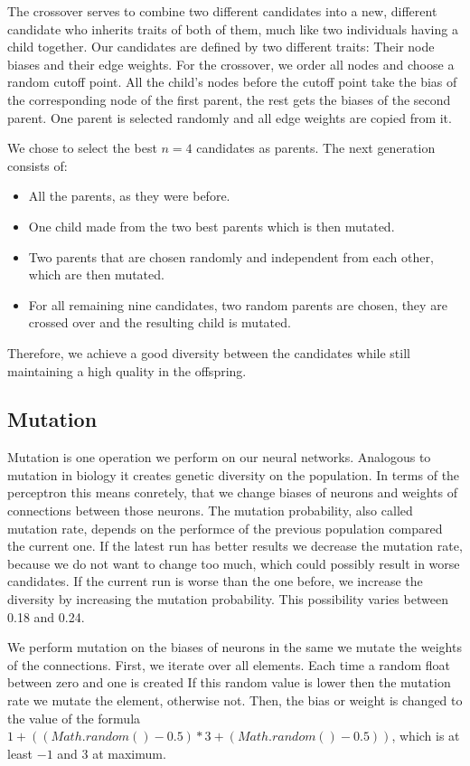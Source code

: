 \documentclass[a4paper,12pt,pagesize,headsepline,bibtotoc,titlepage,abstracton]{scrartcl}
\begin{document}
The crossover serves to combine two different candidates into a new, different candidate who inherits traits of both of them, much like two individuals having a child together. Our candidates are defined by two different traits: Their node biases and their edge weights. For the crossover, we order all nodes and choose a random cutoff point. All the child's nodes before the cutoff point take the bias of the corresponding node of the first parent, the rest gets the biases of the second parent. One parent is selected randomly and all edge weights are copied from it.

We chose to select the best $n=4$ candidates as parents. The next generation consists of:

\begin{itemize}
\item All the parents, as they were before.
\item One child made from the two best parents which is then mutated.
\item Two parents that are chosen randomly and independent from each other, which are then mutated.
\item For all remaining nine candidates, two random parents are chosen, they are crossed over and the resulting child is mutated.
\end{itemize}

Therefore, we achieve a good diversity between the candidates while still maintaining a high quality in the offspring.

\subsection{Mutation}

Mutation is one operation we perform on our neural networks. Analogous to mutation in biology it creates genetic diversity on the population. In terms of the perceptron this means conretely, that we change biases of neurons and weights of connections between those neurons. The mutation probability, also called mutation rate, depends on the performce of the previous population compared the current one. If the latest run has better results we decrease the mutation rate, because we do not want to change too much, which could possibly result in worse candidates. If the current run is worse than the one before, we increase the diversity by increasing the mutation probability. This possibility varies between 0.18 and 0.24.

We perform mutation on the biases of neurons in the same we mutate the weights of the connections. First, we iterate over all elements. Each time a random float between zero and one is created If this random value is lower then the mutation rate we mutate the element, otherwise not. Then, the bias or weight is changed to the value of the formula $1 + ((Math.random() - 0.5) * 3 + (Math.random() - 0.5))$, which is at least $-1$ and $3$ at maximum.
\end{document}
